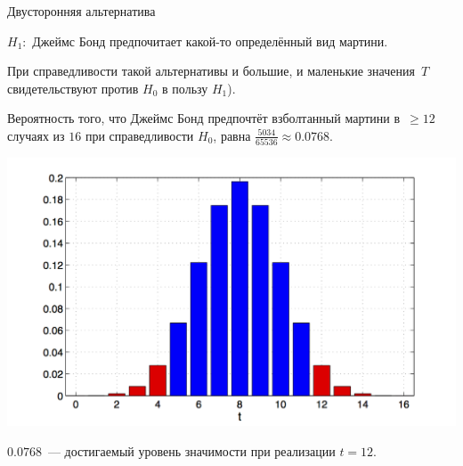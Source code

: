 \documentclass[11pt,pdf,utf8,hyperref={unicode},aspectratio=169]{beamer}
\begin{document}
\begin{frame}{Двусторонняя альтернатива}

    \alert{$H_1\colon$ Джеймс Бонд предпочитает какой-то определённый вид мартини.}

    \medskip

	При справедливости такой альтернативы и большие, и маленькие значения~$T$ свидетельствуют против $H_0$ в пользу $H_1$).

    \medskip

	Вероятность того, что Джеймс Бонд предпочтёт взболтанный мартини в~$\geqslant  12$ случаях из $16$ при справедливости $H_0$, равна $\frac{5034}{65536}\approx 0.0768$.

	\begin{center}
		\includegraphics[height=0.5\textheight]{bond3.png}
	\end{center}
	$0.0768$~--- достигаемый уровень значимости при реализации $t=12$.
\end{frame}
\end{document}
